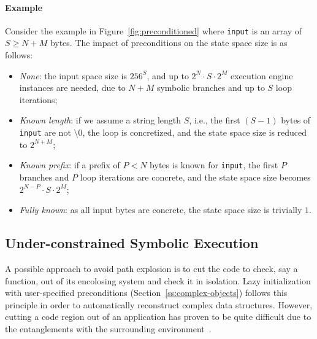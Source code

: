 \paragraph{Example} Consider the example in Figure~\ref{fig:preconditioned} where {\tt input} is an array of $S\ge N+M$ bytes. The impact of preconditions on the state space size is as follows:


\begin{itemize}
  \item {\em None}: the input space size is $256^S$, and up to $2^N\cdot S\cdot 2^M$ execution engine instances are needed, due to $N+M$ symbolic branches and up to $S$ loop iterations;
  \item {\em Known length}: if we assume a string length $S$, i.e., the first $(S-1)$ bytes of {\tt input} are not $\setminus0$, the loop is concretized, and the state space size is reduced to $2^{N+M}$;
  \item {\em Known prefix}: if a prefix of $P<N$ bytes is known for {\tt input}, the first $P$ branches and $P$ loop iterations are concrete, and the state space size becomes $2^{N-P}\cdot S\cdot 2^M$;
  \item {\em Fully known}: as all input bytes are concrete, the state space size is trivially $1$.
\end{itemize}





\subsection{Under-constrained Symbolic Execution} 
\label{under-constrained}

A possible approach to avoid path explosion is to cut the code to check, say a function, out of its encolosing system and check it in isolation. Lazy initialization with user-specified preconditions (Section~\ref{ss:complex-objects}) follows this principle in order to automatically reconstruct complex  data structures. However, cutting a code region out of an application has proven to be quite difficult due to the entanglements with the surrounding environment~\cite{ED-ISSTA07}.

